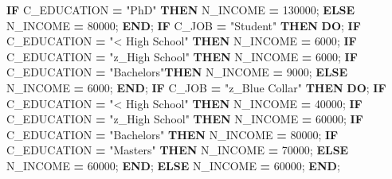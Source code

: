 \documentclass[]{article}
\newenvironment{Shaded}{\begin{snugshade}}{\end{snugshade}}
\newcommand{\KeywordTok}[1]{\textcolor[rgb]{0.13,0.29,0.53}{\textbf{{#1}}}}
\newcommand{\DecValTok}[1]{\textcolor[rgb]{0.00,0.00,0.81}{{#1}}}
\newcommand{\StringTok}[1]{\textcolor[rgb]{0.31,0.60,0.02}{{#1}}}
\newcommand{\NormalTok}[1]{{#1}}
\begin{document}
\begin{Shaded}
\begin{Highlighting}[]
            \KeywordTok{IF} \NormalTok{C_EDUCATION }\KeywordTok{=} \StringTok{"PhD"} \KeywordTok{THEN} \NormalTok{N_INCOME }\KeywordTok{=} \DecValTok{130000}\NormalTok{;}
            \KeywordTok{ELSE} \NormalTok{N_INCOME }\KeywordTok{=} \DecValTok{80000}\NormalTok{;}
        \KeywordTok{END}\NormalTok{;}
        \KeywordTok{IF} \NormalTok{C_JOB }\KeywordTok{=} \StringTok{"Student"} \KeywordTok{THEN} \KeywordTok{DO}\NormalTok{;}
            \KeywordTok{IF} \NormalTok{C_EDUCATION }\KeywordTok{=} \StringTok{"< High School"} \KeywordTok{THEN} \NormalTok{N_INCOME }\KeywordTok{=} \DecValTok{6000}\NormalTok{;}
            \KeywordTok{IF} \NormalTok{C_EDUCATION }\KeywordTok{=} \StringTok{"z_High School"} \KeywordTok{THEN} \NormalTok{N_INCOME }\KeywordTok{=} \DecValTok{6000}\NormalTok{;}
            \KeywordTok{IF} \NormalTok{C_EDUCATION }\KeywordTok{=} \StringTok{"Bachelors"}\KeywordTok{THEN} \NormalTok{N_INCOME }\KeywordTok{=} \DecValTok{9000}\NormalTok{;}
            \KeywordTok{ELSE} \NormalTok{N_INCOME }\KeywordTok{=} \DecValTok{6000}\NormalTok{;}
        \KeywordTok{END}\NormalTok{;}
        \KeywordTok{IF} \NormalTok{C_JOB }\KeywordTok{=} \StringTok{"z_Blue Collar"} \KeywordTok{THEN} \KeywordTok{DO}\NormalTok{;}
            \KeywordTok{IF} \NormalTok{C_EDUCATION }\KeywordTok{=} \StringTok{"< High School"} \KeywordTok{THEN} \NormalTok{N_INCOME }\KeywordTok{=} \DecValTok{40000}\NormalTok{;}
            \KeywordTok{IF} \NormalTok{C_EDUCATION }\KeywordTok{=} \StringTok{"z_High School"} \KeywordTok{THEN} \NormalTok{N_INCOME }\KeywordTok{=} \DecValTok{60000}\NormalTok{;}
            \KeywordTok{IF} \NormalTok{C_EDUCATION }\KeywordTok{=} \StringTok{"Bachelors"} \KeywordTok{THEN} \NormalTok{N_INCOME }\KeywordTok{=} \DecValTok{80000}\NormalTok{;}
            \KeywordTok{IF} \NormalTok{C_EDUCATION }\KeywordTok{=} \StringTok{"Masters"} \KeywordTok{THEN} \NormalTok{N_INCOME }\KeywordTok{=} \DecValTok{70000}\NormalTok{;}
            \KeywordTok{ELSE} \NormalTok{N_INCOME }\KeywordTok{=} \DecValTok{60000}\NormalTok{;}
        \KeywordTok{END}\NormalTok{;}
        \KeywordTok{ELSE} \NormalTok{N_INCOME }\KeywordTok{=} \DecValTok{60000}\NormalTok{;}
    \KeywordTok{END}\NormalTok{;}
    

\end{Highlighting}
\end{Shaded}
\end{document}
